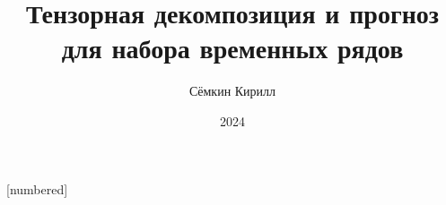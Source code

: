 
\usepackage[justification=centering, font=footnotesize]{caption}
[numbered]

\newcommand{\delayV}[1]{\overset{\leftarrow}{\textbf{x}}_{#1}}
\newcommand{\delayM}[1]{\overset{\leftarrow}{\mathbf{X}}_{#1}}

\usepackage{grffile}

\setlength{\parskip}{0.1cm}

\author{Сёмкин Кирилл \\ }
\date{2024}
\title{Тензорная декомпозиция и прогноз для набора временных рядов}


	
	\begin{frame}[c]
		\titlepage
	\end{frame}

